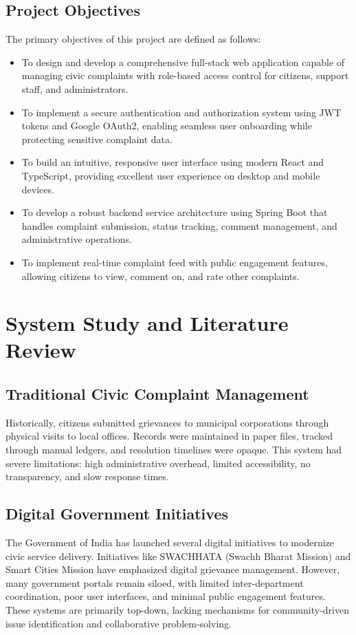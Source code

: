 \documentclass[12pt,a4paper]{report}
\begin{document}
\section{Project Objectives}
The primary objectives of this project are defined as follows:
\begin{itemize}
    \item To design and develop a comprehensive full-stack web application capable of managing civic complaints with role-based access control for citizens, support staff, and administrators.
    \item To implement a secure authentication and authorization system using JWT tokens and Google OAuth2, enabling seamless user onboarding while protecting sensitive complaint data.
    \item To build an intuitive, responsive user interface using modern React and TypeScript, providing excellent user experience on desktop and mobile devices.
    \item To develop a robust backend service architecture using Spring Boot that handles complaint submission, status tracking, comment management, and administrative operations.
    \item To implement real-time complaint feed with public engagement features, allowing citizens to view, comment on, and rate other complaints.
\end{itemize}


\chapter{System Study and Literature Review}

\section{Traditional Civic Complaint Management}
Historically, citizens submitted grievances to municipal corporations through physical visits to local offices. Records were maintained in paper files, tracked through manual ledgers, and resolution timelines were opaque. This system had severe limitations: high administrative overhead, limited accessibility, no transparency, and slow response times.

\section{Digital Government Initiatives}
The Government of India has launched several digital initiatives to modernize civic service delivery. Initiatives like SWACHHATA (Swachh Bharat Mission) and Smart Cities Mission have emphasized digital grievance management. However, many government portals remain siloed, with limited inter-department coordination, poor user interfaces, and minimal public engagement features. These systems are primarily top-down, lacking mechanisms for community-driven issue identification and collaborative problem-solving.
\end{document}
